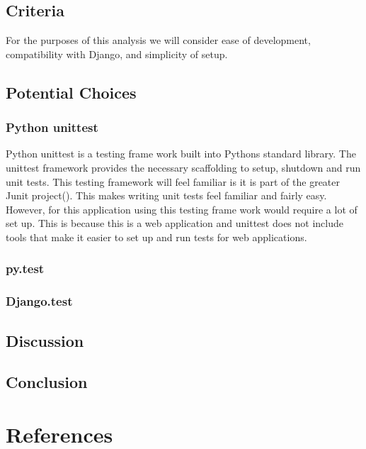 \documentclass[letterpaper,10pt]{article}
\begin{document}
	\subsection{Criteria}
		For the purposes of this analysis we will consider ease of development, compatibility with Django, and simplicity of setup.
	\subsection{Potential Choices}
		\subsubsection{Python unittest}
			Python unittest is a testing frame work built into Pythons standard library. The unittest framework provides the necessary scaffolding to setup, shutdown and run unit tests. This testing framework will feel familiar is it is part of the greater Junit project(). This makes writing unit tests feel familiar and fairly easy. However, for this application using this testing frame work would require a lot of set up. This is because this is a web application and unittest does not include tools that make it easier to set up and run tests for web applications.
		\subsubsection{py.test}
		
		\subsubsection{Django.test}
		
	\subsection{Discussion}
	
	\subsection{Conclusion}
	
\section{References}
\end{document}
